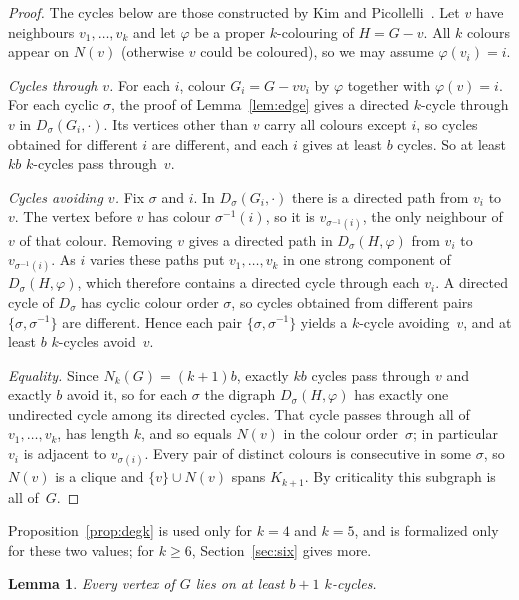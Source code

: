 \documentclass[11pt]{article}
\newtheorem{lemma}{Lemma}
\theoremstyle{remark}
\begin{document}
\begin{proof}
The cycles below are those constructed by Kim and
Picollelli~\cite[proof of Theorem~2.4 and Lemma~2.3]{kp}. Let $v$ have neighbours
$v_1,\dots,v_k$ and let $\varphi$ be a proper
$k$-colouring of $H=G-v$. All $k$ colours appear on $N(v)$ (otherwise $v$
could be coloured), so we may assume $\varphi(v_i)=i$.

\emph{Cycles through $v$.} For each $i$, colour $G_i=G-vv_i$ by $\varphi$
together with $\varphi(v)=i$. For each cyclic $\sigma$, the proof of
Lemma~\ref{lem:edge} gives a directed $k$-cycle through $v$ in
$D_\sigma(G_i,\cdot)$. Its vertices other than $v$ carry all colours except
$i$, so cycles obtained for different $i$ are different, and each $i$ gives at
least $b$ cycles. So at least $kb$ $k$-cycles pass through~$v$.

\emph{Cycles avoiding $v$.} Fix $\sigma$ and $i$. In $D_\sigma(G_i,\cdot)$
there is a directed path from $v_i$ to $v$. The vertex before $v$ has colour
$\sigma^{-1}(i)$, so it is $v_{\sigma^{-1}(i)}$, the only neighbour of $v$ of
that colour. Removing $v$ gives a directed path in $D_\sigma(H,\varphi)$ from
$v_i$ to $v_{\sigma^{-1}(i)}$. As $i$ varies these paths put
$v_1,\dots,v_k$ in one strong component of $D_\sigma(H,\varphi)$, which
therefore contains a directed cycle through each $v_i$. A directed cycle of
$D_\sigma$ has cyclic colour order $\sigma$, so cycles obtained from different
pairs $\{\sigma,\sigma^{-1}\}$ are different. Hence each pair
$\{\sigma,\sigma^{-1}\}$ yields a $k$-cycle avoiding~$v$, and at least $b$
$k$-cycles avoid~$v$.

\emph{Equality.} Since $N_k(G)=(k+1)b$, exactly $kb$ cycles pass through $v$
and exactly $b$ avoid it, so for each $\sigma$ the digraph $D_\sigma(H,\varphi)$
has exactly one undirected cycle among its directed cycles. That cycle passes
through all of $v_1,\dots,v_k$, has length $k$, and so equals $N(v)$ in the
colour order~$\sigma$; in particular $v_i$ is adjacent to
$v_{\sigma(i)}$. Every pair of distinct colours is consecutive in some
$\sigma$, so $N(v)$ is a clique and $\{v\}\cup N(v)$ spans $K_{k+1}$. By
criticality this subgraph is all of~$G$.
\end{proof}

\noindent Proposition~\ref{prop:degk} is used only for $k=4$ and $k=5$, and is
formalized only for these two values; for
$k\ge6$, Section~\ref{sec:six} gives more.

\begin{lemma}\label{lem:order}
Every vertex of $G$ lies on at least $b+1$ $k$-cycles.
\end{lemma}
\end{document}
